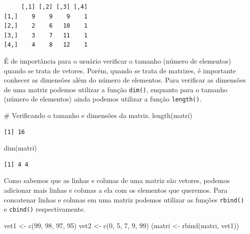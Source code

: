 \documentclass[
  letterpaper,
  DIV=11,
  numbers=noendperiod]{scrreprt}
\newenvironment{Shaded}{\begin{snugshade}}{\end{snugshade}}
\newcommand{\CommentTok}[1]{\textcolor[rgb]{0.37,0.37,0.37}{#1}}
\newcommand{\DecValTok}[1]{\textcolor[rgb]{0.68,0.00,0.00}{#1}}
\newcommand{\FunctionTok}[1]{\textcolor[rgb]{0.28,0.35,0.67}{#1}}
\newcommand{\NormalTok}[1]{\textcolor[rgb]{0.00,0.23,0.31}{#1}}
\newcommand{\OtherTok}[1]{\textcolor[rgb]{0.00,0.23,0.31}{#1}}
\begin{document}
\begin{verbatim}
     [,1] [,2] [,3] [,4]
[1,]    9    9    9    1
[2,]    2    6   10    1
[3,]    3    7   11    1
[4,]    4    8   12    1
\end{verbatim}

É de importância para o usuário verificar o tamanho (número de
elementos) quando se trata de vetores. Porém, quando se trata de
matrizes, é importante conhecer as dimensões além do número de
elementos. Para verificar as dimensões de uma matriz podemos utilizar a
função \texttt{dim()}, enquanto para o tamanho (número de elementos)
ainda podemos utilizar a função \texttt{length()}.

\begin{Shaded}
\begin{Highlighting}[]
\CommentTok{\# Verificando o tamanho e dimensões da matriz.}
\FunctionTok{length}\NormalTok{(matri)}
\end{Highlighting}
\end{Shaded}

\begin{verbatim}
[1] 16
\end{verbatim}

\begin{Shaded}
\begin{Highlighting}[]
\FunctionTok{dim}\NormalTok{(matri)}
\end{Highlighting}
\end{Shaded}

\begin{verbatim}
[1] 4 4
\end{verbatim}

Como sabemos que as linhas e colunas de uma matriz são vetores, podemos
adicionar mais linhas e colunas a ela com os elementos que queremos.
Para concatenar linhas e colunas em uma matriz podemos utilizar as
funções \texttt{rbind()} e \texttt{cbind()} respectivamente.

\begin{Shaded}
\begin{Highlighting}[]
\NormalTok{vet1 }\OtherTok{\textless{}{-}} \FunctionTok{c}\NormalTok{(}\DecValTok{99}\NormalTok{, }\DecValTok{98}\NormalTok{, }\DecValTok{97}\NormalTok{, }\DecValTok{95}\NormalTok{)}
\NormalTok{vet2 }\OtherTok{\textless{}{-}} \FunctionTok{c}\NormalTok{(}\DecValTok{0}\NormalTok{, }\DecValTok{5}\NormalTok{, }\DecValTok{7}\NormalTok{, }\DecValTok{9}\NormalTok{, }\DecValTok{99}\NormalTok{) }
\NormalTok{(matri }\OtherTok{\textless{}{-}} \FunctionTok{rbind}\NormalTok{(matri, vet1))}
\end{Highlighting}
\end{Shaded}
\end{document}
